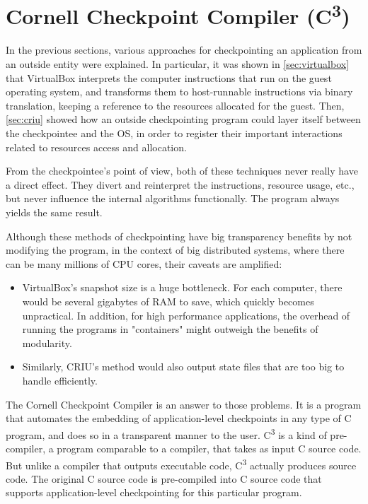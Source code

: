 \section{Cornell Checkpoint Compiler (C\textsuperscript{3})}\label{sec:c3}
In the previous sections, various approaches for checkpointing an application from an outside entity were explained. In particular, it was shown in \autoref{sec:virtualbox} that VirtualBox interprets the computer instructions that run on the guest operating system, and transforms them to host-runnable instructions via binary translation, keeping a reference to the resources allocated for the guest. 
Then, \autoref{sec:criu} showed how an outside checkpointing program could layer itself between the checkpointee and the OS, in order to register their important interactions related to resources access and allocation. 

From the checkpointee's point of view, both of these techniques never really have a direct effect. They divert and reinterpret the instructions, resource usage, etc., but never influence the internal algorithms functionally. The program always yields the same result.

Although these methods of checkpointing have big transparency benefits by not modifying the program, in the context of big distributed systems, where there can be many millions of CPU cores, their caveats are amplified:
\begin{itemize}
	\item VirtualBox's snapshot size is a huge bottleneck. For each computer, there would be several gigabytes of RAM to save, which quickly becomes unpractical. In addition, for high performance applications, the overhead of running the programs in "containers" might outweigh the benefits of modularity.
	\item Similarly, CRIU's method would also output state files that are too big to handle efficiently. 
\end{itemize} 

The Cornell Checkpoint Compiler is an answer to those problems. It is a program that automates the embedding of application-level checkpoints in any type of C program, and does so in a transparent manner to the user. C\textsuperscript{3} is a kind of pre-compiler, a program comparable to a compiler, that takes as input C source code. But unlike a compiler that outputs executable code, C\textsuperscript{3} actually produces source code. The original C source code is pre-compiled into C source code that supports application-level checkpointing for this particular program\cite{report:bronevetsky}.

